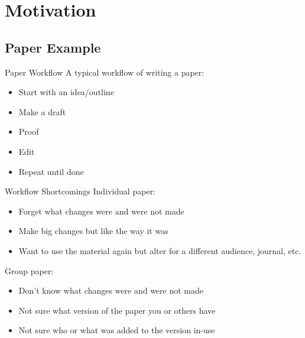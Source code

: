 \documentclass[10pt,t,xcolor=table]{UWMadBeamer}
\date{5/12/2014}
\newenvironment{Itemize}
    {\begin{itemize}\setlength{\itemsep}{0.50em}\setlength{\leftmargin}{0.0em}\setlength{\labelwidth}{0em}}
    {\end{itemize}}
\begin{document}
\begin{frame}
    \titlepage
\end{frame}


\begin{frame}
    \tableofcontents
\end{frame}



\section{Motivation}

    \subsection{Paper Example}

    \begin{frame}{Paper Workflow}
        A typical workflow of writing a paper:
        \begin{Itemize}
            \item{Start with an idea/outline}
            \item{Make a draft}
            \item{Proof}
            \item{Edit}
            \item{Repeat until done}
        \end{Itemize}
    \end{frame}

    \begin{frame}{Workflow Shortcomings}
        Individual paper:
        \begin{Itemize}
            \item{Forget what changes were and were not made}
            \item{Make big changes but like the way it was}
            \item{Want to use the material again but alter for a different audience, journal, etc.}
        \end{Itemize}
        
        Group paper:
        \begin{Itemize}
            \item{Don't know what changes were and were not made}
            \item{Not sure what version of the paper you or others have}
            \item{Not sure who or what was added to the version in-use}
        \end{Itemize}
    \end{frame}
\end{document}
